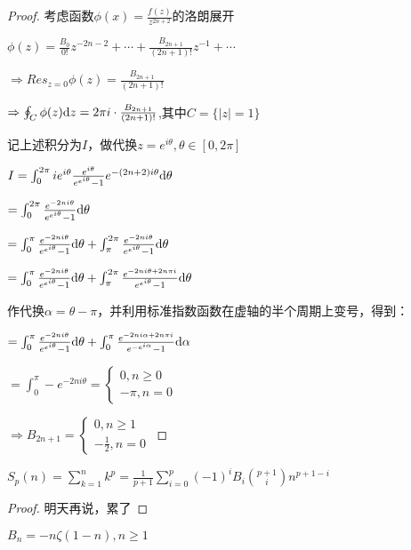 \documentclass[12pt, a4paper, oneside, UTF8]{ctexbook}
\begin{document}
\begin{para}{0}
\begin{para}{1}
\begin{proof}
						考虑函数$\phi(x)=\frac{f(z)}{z^{2n+2}}$的洛朗展开
						
						$\phi(z)=\frac{B_0}{0!}z^{-2n-2}+\cdots+\frac{B_{2n+1}}{(2n+1)!}z^{-1}+\cdots$
						
						$\Rightarrow Res_{z=0}\phi(z)=\frac{B_{2n+1}}{(2n+1)!}$
						
						$\Rightarrow \oint_{C} \phi(z) \mathrm{d} z = 2\pi i\cdot \frac{B_{2n+1}}{(2n+1)!}$,其中$C=\{|z|=1\}$
						
						记上述积分为$I$，做代换$z=e^{i\theta},\theta\in[0,2\pi]$
						
						$I=\int_{0}^{2\pi} i e^{i\theta}\frac{e^{i\theta}}{e^{e^{i\theta}}-1}e^{-(2n+2)i\theta} \mathrm{d} \theta$
						
						$=\int_{0}^{2\pi} \frac{e^{-2ni\theta}}{e^{e^{i\theta}}-1}\mathrm{d}\theta$
						
						$=\int_{0}^{\pi} \frac{e^{-2ni\theta}}{e^{e^{i\theta}}-1}\mathrm{d}\theta+\int_{\pi}^{2\pi} \frac{e^{-2ni\theta}}{e^{e^{i\theta}}-1}\mathrm{d}\theta$
						
						$=\int_{0}^{\pi} \frac{e^{-2ni\theta}}{e^{e^{i\theta}}-1}\mathrm{d}\theta+\int_{\pi}^{2\pi} \frac{e^{-2ni\theta+2n\pi i}}{e^{e^{i\theta}}-1}\mathrm{d}\theta$
						
						作代换$\alpha = \theta-\pi$，并利用标准指数函数在虚轴的半个周期上变号，得到：
						
						$=\int_{0}^{\pi} \frac{e^{-2ni\theta}}{e^{e^{i\theta}}-1}\mathrm{d}\theta+\int_{0}^{\pi} \frac{e^{-2ni\alpha+2n\pi i}}{e^{-e^{i\alpha}}-1}\mathrm{d}\alpha$
						
						$=\int_{0}^{\pi} -e^{-2ni\theta}=\begin{cases}
							0,n \geqslant 0 \\
							-\pi,n=0
						\end{cases}$
						
						$\Rightarrow B_{2n+1}=\begin{cases}
							0,n\geqslant 1 \\
							-\frac{1}{2},n=0 
						\end{cases}$
					\end{proof}
					\begin{proposition}
						$S_p(n)=\sum\limits_{k=1}^{n}k^p=\frac{1}{p+1}\sum\limits_{i=0}^{p} (-1)^i B_i \binom{p+1}{i} n^{p+1-i}$
					\end{proposition}
					\begin{proof}
						明天再说，累了
					\end{proof}
					\point{}
					\begin{proposition}
						$B_n=-n\zeta(1-n),n\geqslant 1$
					\end{proposition}
					

\end{para}
\end{para}
\end{document}
